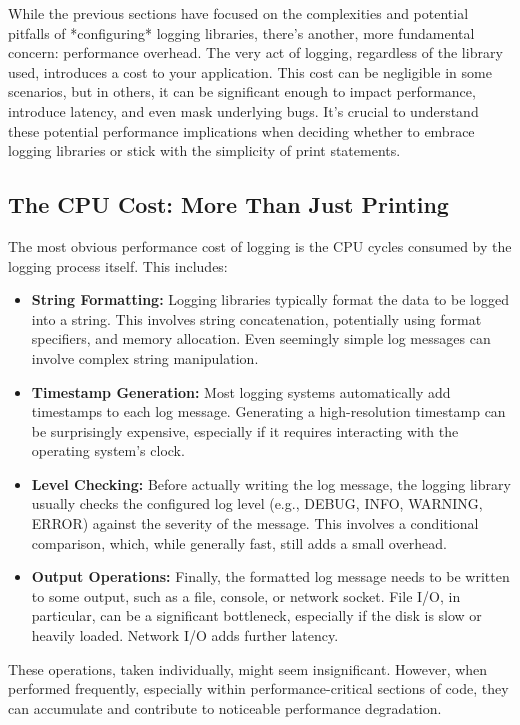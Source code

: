 \documentclass{article}
\begin{document}
{{{{While the previous sections have focused on the complexities and potential pitfalls of *configuring* logging libraries, there's another, more fundamental concern: performance overhead. The very act of logging, regardless of the library used, introduces a cost to your application. This cost can be negligible in some scenarios, but in others, it can be significant enough to impact performance, introduce latency, and even mask underlying bugs. It's crucial to understand these potential performance implications when deciding whether to embrace logging libraries or stick with the simplicity of print statements.

\subsection*{The CPU Cost: More Than Just Printing}

The most obvious performance cost of logging is the CPU cycles consumed by the logging process itself. This includes:

\begin{itemize}
    \item \textbf{String Formatting:} Logging libraries typically format the data to be logged into a string. This involves string concatenation, potentially using format specifiers, and memory allocation. Even seemingly simple log messages can involve complex string manipulation.
    \item \textbf{Timestamp Generation:} Most logging systems automatically add timestamps to each log message. Generating a high-resolution timestamp can be surprisingly expensive, especially if it requires interacting with the operating system's clock.
    \item \textbf{Level Checking:} Before actually writing the log message, the logging library usually checks the configured log level (e.g., DEBUG, INFO, WARNING, ERROR) against the severity of the message. This involves a conditional comparison, which, while generally fast, still adds a small overhead.
    \item \textbf{Output Operations:} Finally, the formatted log message needs to be written to some output, such as a file, console, or network socket. File I/O, in particular, can be a significant bottleneck, especially if the disk is slow or heavily loaded.  Network I/O adds further latency.
\end{itemize}

These operations, taken individually, might seem insignificant. However, when performed frequently, especially within performance-critical sections of code, they can accumulate and contribute to noticeable performance degradation.

}}}}
\end{document}
